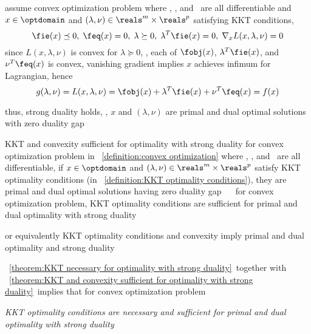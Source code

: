\documentclass[17pt,landscape]{foils}
\begin{document}
{\bit
\item
	assume convex optimization problem where \fobj, \fie, and \feq\ are all differentiable
	and ${x}\in\optdomain$ and $({\lambda}, {\nu})\in\reals^m\times\reals^p$
	satisfying KKT conditions,
	\ie\
	$$
		\fie({x}) \preceq 0, \; \feq({x}) = 0
		, \;
		{\lambda} \succeq 0
		, \;
		{\lambda}^T \fie({x}) = 0
		, \;
		\nabla_x L({x}, {\lambda},{\nu}) = 0
	$$
\vitem
	since $L(x,\lambda,\nu)$ is convex for $\lambda\succeq 0$,
	\ie,
	each of $\fobj(x)$, $\lambda^T \fie(x)$, and $\nu^T \feq(x)$
	is convex,
	vanishing gradient implies $x$ achieves infimum for Lagrangian,
	hence
	$$
		g(\lambda,\nu) = L(x,\lambda,\nu)
		= \fobj(x) + \lambda^T \fie(x) + \nu^T \feq(x)
		= f(x)
	$$

\vitem
	thus, strong duality holds,
	\ie,
	$x$ and $(\lambda,\nu)$ are primal and dual optimal solutions
	with zero duality gap
\eit
\vfill

\myfoilhead{}

\begin{mytheorem}{KKT and convexity sufficient for optimality with strong duality}
	for convex optimization problem in \definitionname~\ref{definition:convex optimization}
	where \fobj, \fie, and \feq\ are all differentiable,
	if ${x}\in\optdomain$ and $({\lambda}, {\nu})\in\reals^m\times\reals^p$
	satisfy KKT optimality conditions (in \definitionname~\ref{definition:KKT optimality conditions}),
	they are primal and dual optimal solutions having zero duality gap
	\ie\
	\shrinkspacewithintheoremslike\
	\ibit
	\iitem
		for convex optimization problem,
		KKT optimality conditions are sufficient for primal and dual optimality with strong duality
	\item []
		or equivalently
	\iitem
		KKT optimality conditions and convexity
		imply primal and dual optimality and strong duality
	\eit
\end{mytheorem}

\bit
\item
	\theoremname~\ref{theorem:KKT necessary for optimality with strong duality}\
	together with
	\theoremname~\ref{theorem:KKT and convexity sufficient for optimality with strong duality}\
	implies
	that
	for convex optimization problem
	\bit
	\item
		\emph{
		KKT optimality conditions are necessary and sufficient
		for primal and dual optimality with strong duality
		}
	\eit
\eit


}
\end{document}
